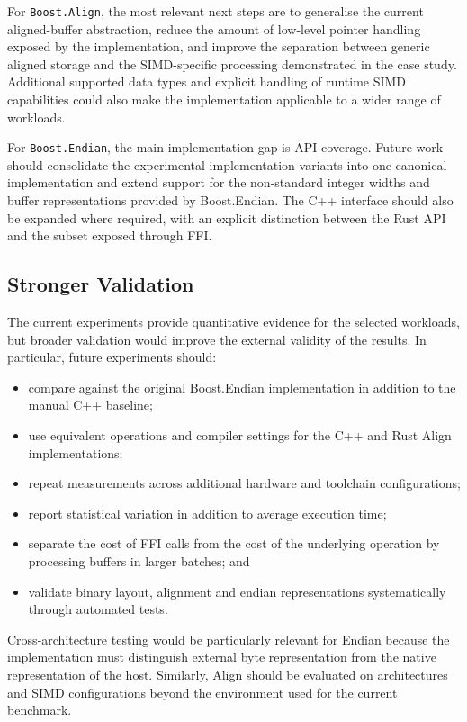 For \texttt{Boost.Align}, the most relevant next steps are to generalise the
current aligned-buffer abstraction, reduce the amount of low-level pointer
handling exposed by the implementation, and improve the separation between
generic aligned storage and the SIMD-specific processing demonstrated in the
case study. Additional supported data types and explicit handling of runtime
SIMD capabilities could also make the implementation applicable to a wider
range of workloads.

For \texttt{Boost.Endian}, the main implementation gap is API coverage.
Future work should consolidate the experimental implementation variants into
one canonical implementation and extend support for the non-standard integer
widths and buffer representations provided by Boost.Endian. The C++ interface
should also be expanded where required, with an explicit distinction between
the Rust API and the subset exposed through FFI.

\subsection{Stronger Validation}

The current experiments provide quantitative evidence for the selected
workloads, but broader validation would improve the external validity of the
results. In particular, future experiments should:

\begin{itemize}
    \item compare against the original Boost.Endian implementation in
    addition to the manual C++ baseline;
    \item use equivalent operations and compiler settings for the C++ and Rust
    Align implementations;
    \item repeat measurements across additional hardware and toolchain
    configurations;
    \item report statistical variation in addition to average execution time;
    \item separate the cost of FFI calls from the cost of the underlying
    operation by processing buffers in larger batches; and
    \item validate binary layout, alignment and endian representations
    systematically through automated tests.
\end{itemize}

Cross-architecture testing would be particularly relevant for Endian because
the implementation must distinguish external byte representation from the
native representation of the host. Similarly, Align should be evaluated on
architectures and SIMD configurations beyond the environment used for the
current benchmark.

